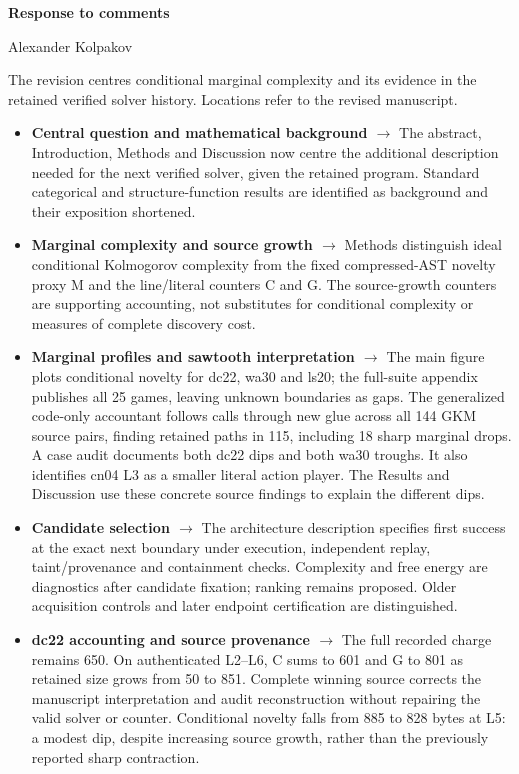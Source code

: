 \documentclass[10pt]{article}
\begin{document}
{\Large\bfseries Response to comments}\par
Alexander Kolpakov

The revision centres conditional marginal complexity and its evidence in the retained verified solver history. Locations refer to the revised manuscript.
\begin{itemize}
\item \textbf{Central question and mathematical background $\rightarrow$} The abstract, Introduction, Methods and Discussion now centre the additional description needed for the next verified solver, given the retained program. Standard categorical and structure-function results are identified as background and their exposition shortened.
\item \textbf{Marginal complexity and source growth $\rightarrow$} Methods distinguish ideal conditional Kolmogorov complexity from the fixed compressed-AST novelty proxy M and the line/literal counters C and G. The source-growth counters are supporting accounting, not substitutes for conditional complexity or measures of complete discovery cost.
\item \textbf{Marginal profiles and sawtooth interpretation $\rightarrow$} The main figure plots conditional novelty for dc22, wa30 and ls20; the full-suite appendix publishes all 25 games, leaving unknown boundaries as gaps. The generalized code-only accountant follows calls through new glue across all 144 GKM source pairs, finding retained paths in 115, including 18 sharp marginal drops. A case audit documents both dc22 dips and both wa30 troughs. It also identifies cn04 L3 as a smaller literal action player. The Results and Discussion use these concrete source findings to explain the different dips.
\item \textbf{Candidate selection $\rightarrow$} The architecture description specifies first success at the exact next boundary under execution, independent replay, taint/provenance and containment checks. Complexity and free energy are diagnostics after candidate fixation; ranking remains proposed. Older acquisition controls and later endpoint certification are distinguished.
\item \textbf{dc22 accounting and source provenance $\rightarrow$} The full recorded charge remains 650. On authenticated L2--L6, C sums to 601 and G to 801 as retained size grows from 50 to 851. Complete winning source corrects the manuscript interpretation and audit reconstruction without repairing the valid solver or counter. Conditional novelty falls from 885 to 828 bytes at L5: a modest dip, despite increasing source growth, rather than the previously reported sharp contraction.

\end{itemize}
\end{document}
